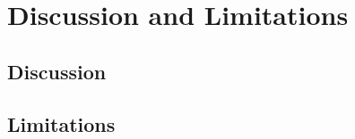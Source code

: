\section{Discussion and Limitations}\label{sec:discussion}

\subsection{Discussion}

\subsection{Limitations}
